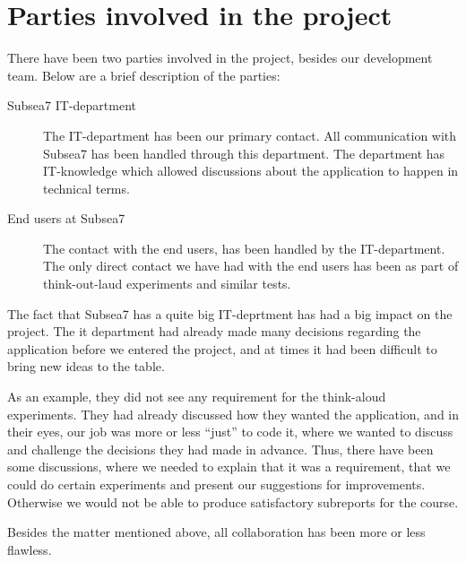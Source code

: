 \section{Parties involved in the project}
There have been two parties involved in the project, besides our development team. 
Below are a brief description of the parties:

\begin{description}
    \item [Subsea7 IT-department] 
        The IT-department has been our primary contact. All communication with 
        Subsea7 has been handled through this department. The department has 
        IT-knowledge which allowed discussions about the application to happen 
        in technical terms.   

    \item [End users at Subsea7]
        The contact with the end users, has been handled by the IT-department. 
        The only direct contact we have had with the end users has been as 
        part of think-out-laud experiments and similar tests.
\end{description}

The fact that Subsea7 has a quite big  IT-deprtment has had a big impact on the project. 
The it department had already made many decisions regarding the application 
before we entered the project, and at times it had been
difficult to bring new ideas to the table. 

As an example, they did not see any requirement for the think-aloud experiments.
They had already discussed how they wanted the application, and in their eyes, our
job was more or less ``just'' to code it, where we wanted to discuss and challenge the
decisions they had made in advance. Thus, there have been some discussions, where we needed
to explain that it was a requirement, that we could do certain  experiments
and present our suggestions for improvements. Otherwise we would not be able to 
produce satisfactory subreports for the course.

Besides the matter mentioned above, all collaboration has been more or less flawless.
